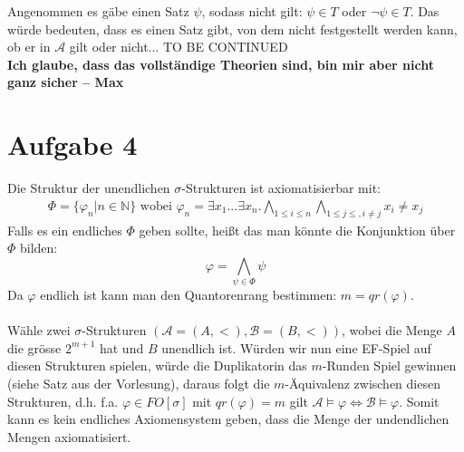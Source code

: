 \documentclass[a4paper,10pt]{article}
\newcommand{\N}{\mathbb{N}}
\begin{document}
\begin{enumerate}[(i)]
\begin{enumerate}[(i)]
Angenommen es gäbe einen Satz $\psi$, sodass nicht gilt: $\psi \in T$ oder $\lnot \psi \in T$.
Das würde bedeuten, dass es einen Satz gibt, von dem nicht festgestellt werden kann, ob er in $\mathcal{A}$ gilt oder nicht... TO BE CONTINUED
\\ \textbf{Ich glaube, dass das vollständige Theorien sind, bin mir aber nicht ganz sicher -- Max}
\end{enumerate}

\section*{Aufgabe 4}
Die Struktur der unendlichen $\sigma$-Strukturen ist axiomatisierbar mit:
\begin{align*}
	\Phi = \{\varphi_n | n \in \N \} \text{ wobei } \varphi_n = \exists x_1 ... \exists x_n. \bigwedge_{1  \le i \le n} \bigwedge_{1 \le j \le, i \neq j} x_i \neq x_j
\end{align*}
Falls es ein endliches $\Phi$ geben sollte, heißt das man könnte die Konjunktion über $\Phi$ bilden:
\[\varphi = \bigwedge_{\psi \in \Phi} \psi \]
Da $\varphi$ endlich ist kann man den Quantorenrang bestimmen: $m = qr(\varphi)$. \\
\\
Wähle zwei $\sigma$-Strukturen $(\mathcal{A} = (A,<),\mathcal{B} = (B,<))$, wobei die Menge $A$ die grösse $2^{m+1}$ hat und $B$ unendlich ist. Würden wir nun eine EF-Spiel auf diesen Strukturen spielen, würde die Duplikatorin das $m$-Runden Spiel gewinnen (siehe Satz aus der Vorlesung), daraus folgt die $m$-Äquivalenz zwischen diesen Strukturen, d.h. f.a. $\varphi \in FO[\sigma] $ mit $qr(\varphi) = m$ gilt $\mathcal{A} \vDash \varphi \Leftrightarrow \mathcal{B} \vDash \varphi$. Somit kann es kein endliches Axiomensystem geben, dass die Menge der undendlichen Mengen axiomatisiert.

\end{enumerate}
\end{document}
